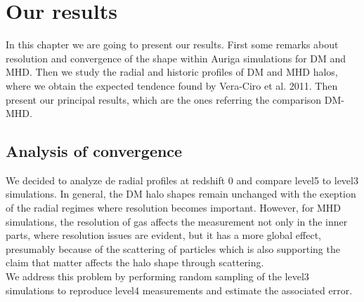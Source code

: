 \chapter{Our results}

In this chapter we are going to present our results. First some remarks about resolution and convergence of the shape within Auriga simulations for DM and MHD. Then we study the radial and historic profiles of DM and MHD halos, where we obtain the expected tendence found by Vera-Ciro et al. 2011. Then present our principal results, which are the ones referring the comparison DM-MHD.

\section{Analysis of convergence}
We decided to analyze de radial profiles at redshift 0 and compare level5 to level3 simulations. In general, the DM halo shapes remain unchanged with the exeption of the radial regimes where resolution becomes important. However, for MHD simulations, the resolution of gas affects the measurement not only in the inner parts, where resolution issues are evident, but it has a more global effect, presumably because of the scattering of particles which is also supporting the claim that matter affects the halo shape through scattering.\\

We address this problem by performing random sampling of the level3 simulations to reproduce level4 measurements and estimate the associated error.\\


